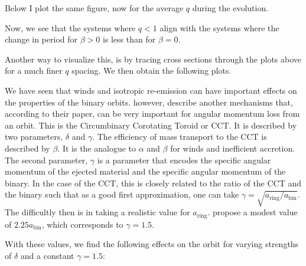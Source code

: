 \documentclass[a4paper,10pt]{article}
\begin{document}
Below I plot the same figure, now for the average \(q\) during the evolution.

\begin{figure}[ht]
    \centering
\end{figure}

Now, we see that the systems where \(q < 1\) align with the systems where the change in period for \(\beta > 0\) is less than for \(\beta =0\).

\begin{figure}[ht]
    \centering
\end{figure}


Another way to visualize this, is by tracing cross sections through the plots above for a much finer \(q\) spacing. We then obtain the following plots.
\begin{figure}[ht]
    \centering
\end{figure}



We have seen that winds and isotropic re-emission can have important effects on the properties of the binary orbits. \citet{soberman1997} however, describe another mechanisms that, according to their paper, can be very important for angular momentum loss from an orbit. This is the Circumbinary Corotating Toroid or CCT. It is described by two parameters, \(\delta \) and \(\gamma \). The efficiency of mass transport to the CCT is described by \(\beta \). It is the analogue to \(\alpha \) and \(\beta \) for winds and inefficient accretion. The second parameter, \(\gamma \) is a parameter that encodes the specific angular momentum of the ejected material and the specific angular momentum of the binary. In the case of the CCT, this is closely related to the ratio of the CCT and the binary such that as a good first approximation, one can take \(\gamma = \sqrt{a_\text{ring} / a_\text{bin}} \). The difficultly then is in taking a realistic value for \(a_\text{ring}\). \citet{soberman1997} propose a modest value of \(2.25 a_\text{bin}\), which corresponds to \(\gamma = 1.5\).

With these values, we find the following effects on the orbit for varying strengths of \(\delta \) and a constant \(\gamma = 1.5\):
\end{document}
